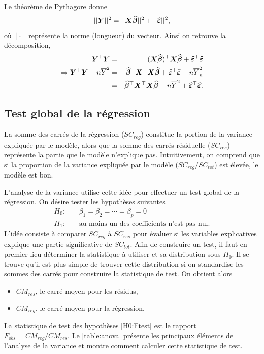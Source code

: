 Le théorème de Pythagore donne
$$||\bm{Y}||^2=||\bm{X}\widehat{\bm\beta}||^2+||\widehat{\bm\varepsilon}||^2,$$
o\`u $||\cdot||$ représente la norme (longueur) du vecteur.
Ainsi on retrouve la décomposition,
\begin{eqnarray*}
\bm{Y}^\top\bm{Y}&=&(\bm{X}\widehat{\bm\beta})^\top\bm{X}\widehat{\bm\beta}+\widehat{\bm\varepsilon}^\top\widehat{\bm\varepsilon}\\
\Rightarrow\bm{Y}^\top\bm{Y}-n\overline{Y}^2&=&\widehat{\bm\beta}^\top\bm{X}^\top\bm{X}\widehat{\bm\beta}
+\widehat{\bm\varepsilon}^\top\widehat{\bm\varepsilon}-n\overline{Y}^2_n\\
&=&\widehat{\bm\beta}^\top\bm{X}^\top\bm{X}\widehat{\bm\beta}-n\overline{Y}^2+\widehat{\bm\varepsilon}^\top\widehat{\bm\varepsilon}.
\end{eqnarray*}


\subsection{Test global de la régression}

La somme des carrés de la régression ($SC_{reg}$) constitue la portion de la variance expliquée par le modèle, alors que la somme des carrés résiduelle ($SC_{res}$) représente la partie que le modèle n'explique pas. Intuitivement, on comprend que si la proportion de la variance expliquée par le modèle ($SC_{reg}/SC_{tot}$) est élevée, le modèle est bon.

L'analyse de la variance utilise cette idée pour effectuer un test global de la régression. On désire tester les hypothèses suivantes
\begin{eqnarray}
H_0:&~&\beta_1=\beta_2=\cdots=\beta_{p}=0\label{H0:Ftest}\\
H_1:&~&\mbox{au moins un des coefficients n'est pas nul.}\nonumber
\end{eqnarray}
L'idée consiste à comparer $SC_{reg}$ à $SC_{res}$ pour évaluer si les variables explicatives explique une partie significative de $SC_{tot}$. Afin de construire un test, il faut en premier lieu déterminer la statistique à utiliser et sa distribution  sous $H_0$. Il se trouve qu'il est plus simple de trouver cette distribution si on standardise les sommes des carrés pour construire la statistique de test. On obtient alors 
\begin{itemize}
    \item $CM_{res}$, le carré moyen pour les résidus, 
    \item $CM_{reg}$, le carré moyen pour la régression.
\end{itemize} 
La statistique de test des hypothèses \ref{H0:Ftest} est le rapport $F_{obs} = CM_{reg}/CM_{res}$. Le \autoref{table:anova} présente les principaux éléments de l'analyse de la variance et montre comment calculer cette statistique de test.

